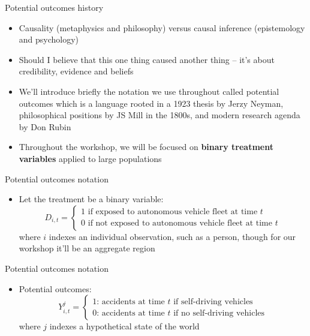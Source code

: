 \documentclass{beamer}
\begin{document}
\begin{frame}{Potential outcomes history}

\begin{itemize}

\item Causality (metaphysics and philosophy) versus causal inference (epistemology and psychology)
\item Should I believe that this one thing caused another thing -- it's about credibility, evidence and beliefs
\item We'll introduce briefly the notation we use throughout called potential outcomes which is a language rooted in a 1923 thesis by Jerzy Neyman, philosophical positions by JS Mill in the 1800s, and modern research agenda by Don Rubin
\item Throughout the workshop, we will be focused on \textbf{binary treatment variables} applied to large populations
\end{itemize}

\end{frame}




\begin{frame}{Potential outcomes notation}
	
	\begin{itemize}
	\item Let the treatment be a binary variable: $$D_{i,t} =\begin{cases} 1 \text{ if exposed to autonomous vehicle fleet at time $t$} \\ 0 \text{ if not exposed to autonomous vehicle fleet at time $t$} \end{cases}$$where $i$ indexes an individual observation, such as a person, though for our workshop it'll be an aggregate region

	\end{itemize}
\end{frame}

\begin{frame}{Potential outcomes notation}
	
	\begin{itemize}

	\item Potential outcomes: $$Y_{i,t}^j =\begin{cases} 1 \text{: accidents at time $t$ if self-driving vehicles} \\ 0 \text{: accidents at time $t$ if no self-driving vehicles} \end{cases}$$where $j$ indexes a hypothetical state of the world 

	\end{itemize}
\end{frame}
\end{document}
